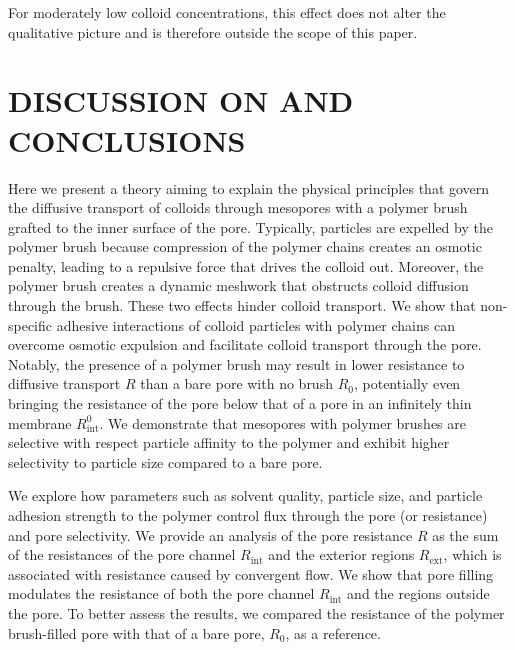 \documentclass[12pt, a4paper]{article}
\begin{document}
For moderately low colloid concentrations, this effect does not alter the qualitative picture and is therefore outside the scope of this paper.

\section{DISCUSSION ON AND CONCLUSIONS}
Here we present a theory aiming to explain the physical principles that govern the diffusive transport of colloids through mesopores with a polymer brush grafted to the inner surface of the pore.
Typically, particles are expelled by the polymer brush because compression of the polymer chains creates an osmotic penalty, leading to a repulsive force that drives the colloid out.
Moreover, the polymer brush creates a dynamic meshwork that obstructs colloid diffusion through the brush.
These two effects hinder colloid transport.
We show that non-specific adhesive interactions of colloid particles with polymer chains can overcome osmotic expulsion and facilitate colloid transport through the pore.
Notably, the presence of a polymer brush may result in lower resistance to diffusive transport $R$ than a bare pore with no brush $R_{0}$, potentially even bringing the resistance of the pore below that of a pore in an infinitely thin membrane $R_{\text{int}}^{0}$.
We demonstrate that mesopores with polymer brushes are selective with respect particle affinity to the polymer and exhibit higher selectivity to particle size compared to a bare pore.

We explore how parameters such as solvent quality, particle size, and particle adhesion strength to the polymer control flux through the pore (or resistance) and pore selectivity.
We provide an analysis of the pore resistance $R$ as the sum of the resistances of the pore channel $R_{\text{int}}$ and the exterior regions $R_{\text{ext}}$, which is associated with resistance caused by convergent flow.
We show that pore filling modulates the resistance of both the pore channel $R_{\text{int}}$ and the regions outside the pore.
To better assess the results, we compared the resistance of the polymer brush-filled pore with that of a bare pore, $R_{0}$, as a reference. 
\end{document}
